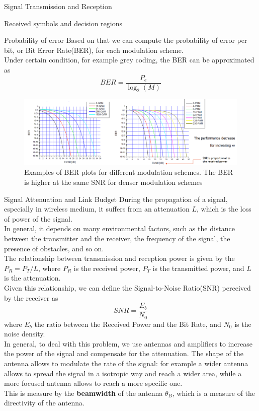 \begin{section}{Signal Transmission and Reception}
\begin{subsection}{Received symbols and decision regions}
\begin{subsubsection}{Probability of error}
      Based on that we can compute the probability of error per bit, or Bit Error Rate(BER), for 
      each modulation scheme.\\
      Under certain condition, for example grey coding, the BER can be approximated as
      \begin{equation}
        BER=\frac{P_e}{\log_2(M)}
      \end{equation}
      \begin{figure}[h]
        \centering
        \includegraphics[width=\textwidth]{img/wireless/BER plots.png}
        \caption{Examples of BER plots for different modulation schemes. The BER is higher at the same 
        SNR for denser modulation schemes}
        \label{fig:BER plots}
      \end{figure}
    \end{subsubsection}
  \end{subsection}
  \begin{subsection}{Signal Attenuation and Link Budget}
    During the propagation of a signal, especially in wireless medium, it suffers from an 
    attenuation $L$, which is the loss of power of the signal.\\
    In general, it depends on many environmental factors, such as the distance between the
    transmitter and the receiver, the frequency of the signal, the presence of obstacles, and so on.\\

    The relationship between transmission and reception power is given by the $P_{R}=P_{T}/L$, where
    $P_{R}$ is the received power, $P_{T}$ is the transmitted power, and $L$ is the attenuation.\\
    Given this relationship, we can define the Signal-to-Noise Ratio(SNR) perceived by the receiver
    as
    \begin{equation}
      SNR=\frac{E_b}{N_0}
    \end{equation}
    where $E_b$ the ratio between the Received Power and the Bit Rate, and $N_0$ is the noise density.\\
    In general, to deal with this problem, we use antennas and amplifiers to increase the power of the
    signal and compensate for the attenuation. The shape of the antenna allows to modulate the
    rate of the signal: for example a wider antenna allows to spread the signal in a isotropic way
    and reach a wider area, while a more focused antenna allows to reach a more specific one.\\
    This is measure by the \textbf{beamwidth} of the antenna $\theta_B$, which is a measure of the 
    directivity of the antenna.\\


\end{subsection}
\end{section}

